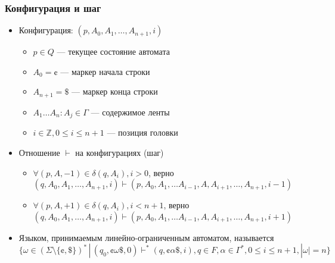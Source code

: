 \documentclass{beamer}
\begin{document}
\begin{frame}[fragile]
  \transwipe[direction=90]
  \frametitle{Конфигурация и шаг}
\begin{itemize}
  \item Конфигурация: $(p, A_0, A_1, \dots, A_{n+1}, i)$
  \begin{itemize}
  	\item $p \in Q$ --- текущее состояние автомата
  	\item $A_0 = \cent$ --- маркер начала строки
  	\item $A_{n+1} = \$ $ --- маркер конца строки
  	\item $A_1 \dots A_n: A_j \in \Gamma$ --- содержимое ленты
  	\item $i \in \mathds{Z}, 0 \leq i \leq n+1$ --- позиция головки
  \end{itemize}    
  \item Отношение $\vdash$ на конфигурациях (шаг)
  \begin{itemize}
  	\item $\forall (p, A, -1) \in \delta(q, A_i), i > 0$, верно $(q, A_0, A_1, \dots, A_{n+1}, i) \vdash (p, A_0, A_1, \dots A_{i-1}, A, A_{i+1}, \dots, A_{n+1}, i - 1)$
  	\item $\forall (p, A, +1) \in \delta(q, A_i), i < n+1$, верно $(q, A_0, A_1, \dots, A_{n+1}, i) \vdash (p, A_0, A_1, \dots A_{i-1}, A, A_{i+1}, \dots, A_{n+1}, i + 1)$
  \end{itemize}
  \item Языком, принимаемым линейно-ограниченным автоматом, называется $\{ \omega \in (\Sigma \setminus \{ \cent, \$ \})^* \, | \, (q_0, \cent \omega \$, 0) \vdash^* (q, \cent \alpha \$, i), q \in F, \alpha \in \Gamma^*, 0 \leq i \leq n+1, |\omega| = n \}$
\end{itemize}

\end{frame}
\end{document}
